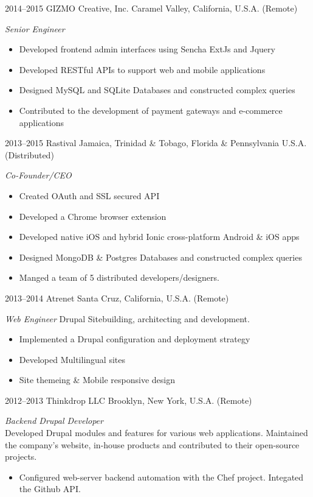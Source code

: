 \documentclass[]{friggeri-cv} %
\begin{document}
\begin{entrylist}
\entry
{2014--2015}
{GIZMO Creative, Inc.}
{Caramel Valley, California, U.S.A. (Remote)}
{\emph{Senior Engineer}
\begin{itemize}
\item Developed frontend admin interfaces using Sencha ExtJs and Jquery
\item Developed RESTful APIs to support web and mobile applications
\item Designed MySQL and SQLite Databases and constructed complex queries
\item Contributed to the development of payment gateways and e-commerce applications
\end{itemize}}
\entry
{2013--2015}
{Rastival}
{Jamaica, Trinidad \& Tobago, Florida \& Pennsylvania U.S.A. (Distributed)}
{\emph{Co-Founder/CEO}
\begin{itemize}
\item Created OAuth and SSL secured API
\item Developed a Chrome browser extension
\item Developed native iOS and hybrid Ionic cross-platform Android \& iOS apps
\item Designed MongoDB \& Postgres Databases and constructed complex queries
\item Manged a team of 5 distributed developers/designers.
\end{itemize}}
\entry
{2013--2014}
{Atrenet}
{Santa Cruz, California, U.S.A. (Remote)}
{\emph{Web Engineer}
Drupal Sitebuilding, architecting and development.
\begin{itemize}
\item Implemented a Drupal configuration and deployment strategy
\item Developed Multilingual sites
\item Site themeing \& Mobile responsive design
\end{itemize}}
\entry
{2012--2013}
{Thinkdrop LLC}
{Brooklyn, New York, U.S.A. (Remote)}
{ \emph{Backend Drupal Developer } \\
Developed Drupal modules and features for various web applications. Maintained the company's website, in-house products and contributed to their open-source projects.
\begin{itemize}
\item Configured web-server backend automation with the Chef project. Integated the Github API.

\end{itemize}}
\end{entrylist}
\end{document}
